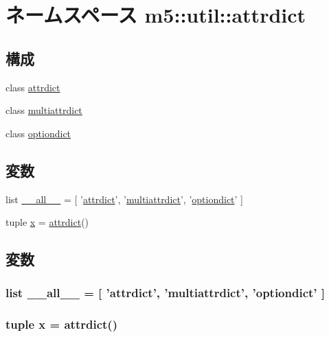 \hypertarget{namespacem5_1_1util_1_1attrdict}{
\section{ネームスペース m5::util::attrdict}
\label{namespacem5_1_1util_1_1attrdict}
}
\subsection*{構成}
\begin{DoxyCompactItemize}
\item 
class \hyperlink{classm5_1_1util_1_1attrdict_1_1attrdict}{attrdict}
\item 
class \hyperlink{classm5_1_1util_1_1attrdict_1_1multiattrdict}{multiattrdict}
\item 
class \hyperlink{classm5_1_1util_1_1attrdict_1_1optiondict}{optiondict}
\end{DoxyCompactItemize}
\subsection*{変数}
\begin{DoxyCompactItemize}
\item 
list \hyperlink{namespacem5_1_1util_1_1attrdict_aa4a022e6ddacd362b83964da5cc5d044}{\_\-\_\-all\_\-\_\-} = \mbox{[} '\hyperlink{classm5_1_1util_1_1attrdict_1_1attrdict}{attrdict}', '\hyperlink{classm5_1_1util_1_1attrdict_1_1multiattrdict}{multiattrdict}', '\hyperlink{classm5_1_1util_1_1attrdict_1_1optiondict}{optiondict}' \mbox{]}
\item 
tuple \hyperlink{namespacem5_1_1util_1_1attrdict_a7a74e6f2f6355f34b63513f77c839a9e}{x} = \hyperlink{classm5_1_1util_1_1attrdict_1_1attrdict}{attrdict}()
\end{DoxyCompactItemize}


\subsection{変数}
\hypertarget{namespacem5_1_1util_1_1attrdict_aa4a022e6ddacd362b83964da5cc5d044}{
\subsubsection[{\_\-\_\-all\_\-\_\-}]{\setlength{\rightskip}{0pt plus 5cm}list {\bf \_\-\_\-all\_\-\_\-} = \mbox{[} '{\bf attrdict}', '{\bf multiattrdict}', '{\bf optiondict}' \mbox{]}}}
\label{namespacem5_1_1util_1_1attrdict_aa4a022e6ddacd362b83964da5cc5d044}
\hypertarget{namespacem5_1_1util_1_1attrdict_a7a74e6f2f6355f34b63513f77c839a9e}{
\subsubsection[{x}]{\setlength{\rightskip}{0pt plus 5cm}tuple {\bf x} = {\bf attrdict}()}}
\label{namespacem5_1_1util_1_1attrdict_a7a74e6f2f6355f34b63513f77c839a9e}
